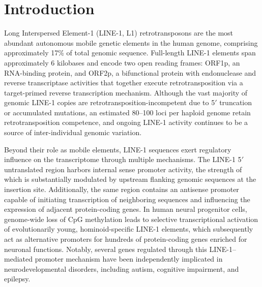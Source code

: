 \documentclass[preprints,briefreport,submit,pdftex,oneauthor]{Definitions/mdpi}
\begin{document}
\section{Introduction}

Long Interspersed Element-1 (LINE-1, L1) retrotransposons are
the most abundant autonomous mobile genetic elements in the
human genome, comprising approximately 17\% of total genomic
sequence\cite{lander2001,encode2012,ardeljan2017, beck2010}.
Full-length LINE-1 elements span approximately 6 kilobases and encode two open
reading frames: ORF1p, an RNA-binding protein, and ORF2p, a
bifunctional protein with endonuclease and reverse transcriptase
activities that together execute retrotransposition via a
target-primed reverse transcription mechanism\cite{ardeljan2017}.
Although the vast majority of genomic LINE-1 copies are
retrotransposition-incompetent due to 5$'$ truncation or
accumulated mutations, an estimated 80--100 loci per haploid
genome retain retrotransposition competence, and ongoing LINE-1
activity continues to be a source of inter-individual genomic
variation\cite{beck2010}.

Beyond their role as mobile elements, LINE-1 sequences exert
regulatory influence on the transcriptome through multiple
mechanisms. The LINE-1 5$'$ untranslated region harbors
internal sense promoter activity, the strength of which is
substantially modulated by upstream flanking genomic sequences
at the insertion site\cite{lavie2004}. Additionally, the same
region contains an antisense promoter capable of initiating
transcription of neighboring sequences and influencing the
expression of adjacent protein-coding genes\cite{honda2020}.
In human neural progenitor cells, genome-wide loss of CpG
methylation leads to selective transcriptional activation of
evolutionarily young, hominoid-specific LINE-1 elements, which
subsequently act as alternative promoters for hundreds of
protein-coding genes enriched for neuronal functions\cite{jonsson2019}.
Notably, several genes regulated through this LINE-1--mediated
promoter mechanism have been independently implicated in
neurodevelopmental disorders, including autism, cognitive
impairment, and epilepsy\cite{jonsson2019}.
\end{document}
